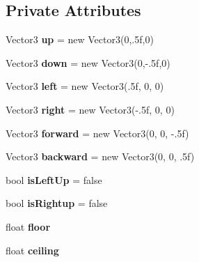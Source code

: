 \subsection*{Private Attributes}
\begin{DoxyCompactItemize}
\item 
\mbox{\label{class_feet_script_ae30d66ec632e11c715e7044720aebb64}} 
Vector3 {\bfseries up} = new Vector3(0,.\+5f,0)
\item 
\mbox{\label{class_feet_script_a7952de55c432fe1b654f9f65259b9094}} 
Vector3 {\bfseries down} = new Vector3(0,-\/.\+5f,0)
\item 
\mbox{\label{class_feet_script_a12493e008428b1e9c0f5701546f227dd}} 
Vector3 {\bfseries left} = new Vector3(.\+5f, 0, 0)
\item 
\mbox{\label{class_feet_script_a8535473d7ea355117ebf991b4e39a2b9}} 
Vector3 {\bfseries right} = new Vector3(-\/.\+5f, 0, 0)
\item 
\mbox{\label{class_feet_script_a0673abdd976ea41af7ddff346c8f35d1}} 
Vector3 {\bfseries forward} = new Vector3(0, 0, -\/.\+5f)
\item 
\mbox{\label{class_feet_script_a8ad78c713000b0ca1ce54eca79be8e57}} 
Vector3 {\bfseries backward} = new Vector3(0, 0, .\+5f)
\item 
\mbox{\label{class_feet_script_a598594b8d37d4cf5a5285e95e4a04564}} 
bool {\bfseries is\+Left\+Up} = false
\item 
\mbox{\label{class_feet_script_a4ae877e26a7faecfb3d31b8969afe1c8}} 
bool {\bfseries is\+Rightup} = false
\item 
\mbox{\label{class_feet_script_a4884fec2f441f9c9934ff8d6c1a62a76}} 
float {\bfseries floor}
\item 
\mbox{\label{class_feet_script_a0e937a75b694cc7fe1766df4c4957651}} 
float {\bfseries ceiling}
\item 
\mbox{\label{class_feet_script_afe5d29794e5023d30c7a3bc67620e6ba}} 

\end{DoxyCompactItemize}
